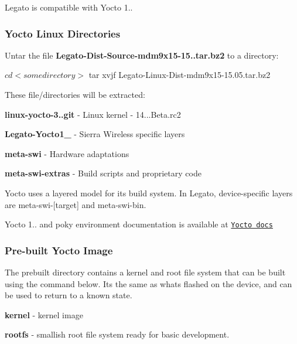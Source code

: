 Legato is compatible with Yocto 1..\hypertarget{yocto_legato_getstartedYoctoLinux_yoctoDirectories}{}\subsubsection{Yocto Linux Directories}\label{yocto_legato_getstartedYoctoLinux_yoctoDirectories}
Untar the file {\bfseries Legato-\/\+Dist-\/\+Source-\/mdm9x15-\/15..\+tar.\+bz2} to a directory\+: 
\begin{DoxyCode}
$ cd <some directory>
$ tar xvjf Legato-Linux-Dist-mdm9x15-15.05.tar.bz2
\end{DoxyCode}


These file/directories will be extracted\+:
\begin{DoxyItemize}
\item {\bfseries linux-\/yocto-\/3..\+git} -\/ Linux kernel -\/ 14...\+Beta.\+rc2
\item {\bfseries Legato-\/\+Yocto1\+\_} -\/ Sierra Wireless specific layers
\item {\bfseries meta-\/swi} -\/ Hardware adaptations
\item {\bfseries meta-\/swi-\/extras} -\/ Build scripts and proprietary code
\end{DoxyItemize}

Yocto uses a layered model for its build system. In Legato, device-\/specific layers are {\ttfamily meta-\/swi-\/}\mbox{[}target\mbox{]} and {\ttfamily meta-\/swi-\/bin}.

Yocto 1.. and poky environment documentation is available at \href{https://www.yoctoproject.org/documentation/archived?keys=&field_version_tid=45}{\tt Yocto docs}\hypertarget{yocto_legato_getstartedYoctoLinux_prebuiltYoctoImages}{}\subsubsection{Pre-\/built Yocto Image}\label{yocto_legato_getstartedYoctoLinux_prebuiltYoctoImages}
The prebuilt directory contains a kernel and root file system that can be built using the command below. It\textquotesingle{}s the same as what\textquotesingle{}s flashed on the device, and can be used to return to a known state.


\begin{DoxyItemize}
\item {\bfseries kernel} -\/ kernel image
\item {\bfseries rootfs} -\/ smallish root file system ready for basic development.
\end{DoxyItemize}

